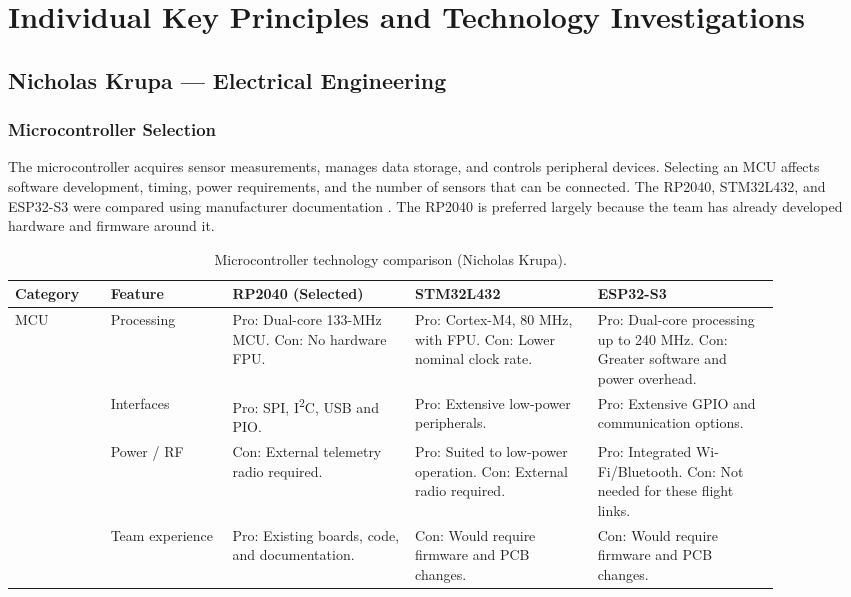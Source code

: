 \documentclass[11pt]{IEEEtran}
\begin{document}
\section{Individual Key Principles and Technology Investigations}

\subsection{Nicholas Krupa --- Electrical Engineering}
\subsubsection{Microcontroller Selection}
The microcontroller acquires sensor measurements, manages data storage, and controls peripheral devices. Selecting an MCU affects software development, timing, power requirements, and the number of sensors that can be connected. The RP2040, STM32L432, and ESP32-S3 were compared using manufacturer documentation \cite{rp2040,stm32,esp32}. The RP2040 is preferred largely because the team has already developed hardware and firmware around it.

\begin{table}[H]
\centering\small
\begin{tabular}{@{}p{0.115\linewidth}p{0.145\linewidth}p{0.21\linewidth}p{0.21\linewidth}p{0.21\linewidth}@{}}
\toprule
\textbf{Category} & \textbf{Feature} & \textbf{RP2040 (Selected)} & \textbf{STM32L432} & \textbf{ESP32-S3} \\
\midrule
\multirow{4}{*}{MCU}
 & Processing & Pro: Dual-core 133-MHz MCU. Con: No hardware FPU. & Pro: Cortex-M4, 80 MHz, with FPU. Con: Lower nominal clock rate. & Pro: Dual-core processing up to 240 MHz. Con: Greater software and power overhead. \\ \cmidrule{2-5}
 & Interfaces & Pro: SPI, I\textsuperscript{2}C, USB and PIO. & Pro: Extensive low-power peripherals. & Pro: Extensive GPIO and communication options. \\ \cmidrule{2-5}
 & Power / RF & Con: External telemetry radio required. & Pro: Suited to low-power operation. Con: External radio required. & Pro: Integrated Wi-Fi/Bluetooth. Con: Not needed for these flight links. \\ \cmidrule{2-5}
 & Team experience & Pro: Existing boards, code, and documentation. & Con: Would require firmware and PCB changes. & Con: Would require firmware and PCB changes. \\
\bottomrule
\end{tabular}
\vspace{3mm}
\caption{Microcontroller technology comparison (Nicholas Krupa).}
\label{tab:MCU_Comparison}
\end{table}
\end{document}
